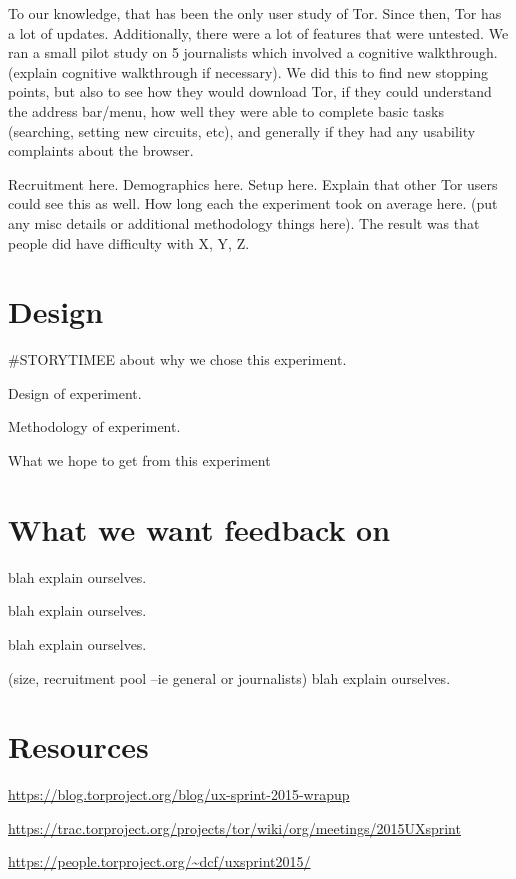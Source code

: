 \documentclass{sig-alternate-hotpets15}
\begin{document}
To our knowledge, that has been the only user study of Tor. Since then, Tor has a lot of updates. Additionally, there were a lot of features that were untested. We ran a small pilot study on 5 journalists which involved a cognitive walkthrough.(explain cognitive walkthrough if necessary). We did this to find new stopping points, but also to see how they would download Tor, if they could understand the address bar/menu, how well they were able to complete basic tasks (searching, setting new circuits, etc), and generally if they had any usability complaints about the browser. 

Recruitment here. Demographics here. Setup here. Explain that other Tor users could see this as well. How long each the experiment took on average here. (put any misc details or additional methodology things here). The result was that people did have difficulty with X, Y, Z.

\section{Design}
\#STORYTIMEE  about why we chose this experiment. 

Design of experiment. 

Methodology of experiment. 

What we hope to get from this experiment

\section{What we want feedback on}

 blah explain ourselves. 

 blah explain ourselves. 

 blah explain ourselves. 

 (size, recruitment pool --ie general or journalists) blah explain ourselves. 

\section{Resources}

\url{https://blog.torproject.org/blog/ux-sprint-2015-wrapup}

\url{https://trac.torproject.org/projects/tor/wiki/org/meetings/2015UXsprint}

\url{https://people.torproject.org/~dcf/uxsprint2015/}


 
\end{document}
